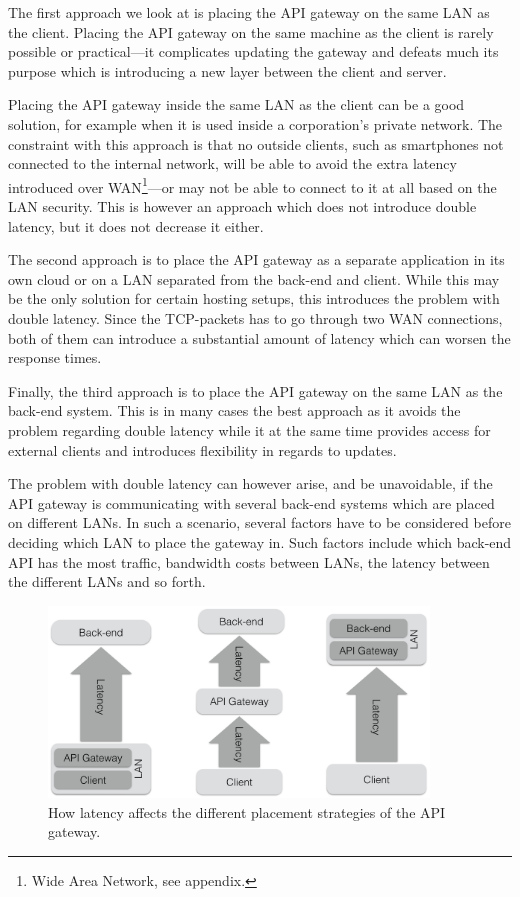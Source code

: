 \documentclass{cslthse-msc}
\begin{document}
The first approach we look at is placing the API gateway on the same LAN as the client. Placing the API gateway on the same machine as the client is rarely possible or practical---it complicates updating the gateway and defeats much its purpose which is introducing a new layer between the client and server. 

Placing the API gateway inside the same LAN as the client can be a good solution, for example when it is used inside a corporation's private network. The constraint with this approach is that no outside clients, such as smartphones not connected to the internal network, will be able to avoid the extra latency introduced over WAN\footnote{Wide Area Network, see appendix.}---or may not be able to connect to it at all based on the LAN security. This is however an approach which does not introduce double latency, but it does not decrease it either.

The second approach is to place the API gateway as a separate application in its own cloud or on a LAN separated from the back-end and client. While this may be the only solution for certain hosting setups, this introduces the problem with double latency. Since the TCP-packets has to go through two WAN connections, both of them can introduce a substantial amount of latency which can worsen the response times.

Finally, the third approach is to place the API gateway on the same LAN as the back-end system. This is in many cases the best approach as it avoids the problem regarding double latency while it at the same time provides access for external clients and introduces flexibility in regards to updates. 

The problem with double latency can however arise, and be unavoidable, if the API gateway is communicating with several back-end systems which are placed on different LANs. In such a scenario, several factors have to be considered before deciding which LAN to place the gateway in. Such factors include which back-end API has the most traffic, bandwidth costs between LANs, the latency between the different LANs and so forth.

\begin{figure}[H]
  \centering
    \begin{center}
      \includegraphics[width=0.9\textwidth]{images/api_gateway_latency.png}
    \end{center}
  \caption{How latency affects the different placement strategies of the API gateway.}
\end{figure}
\end{document}
